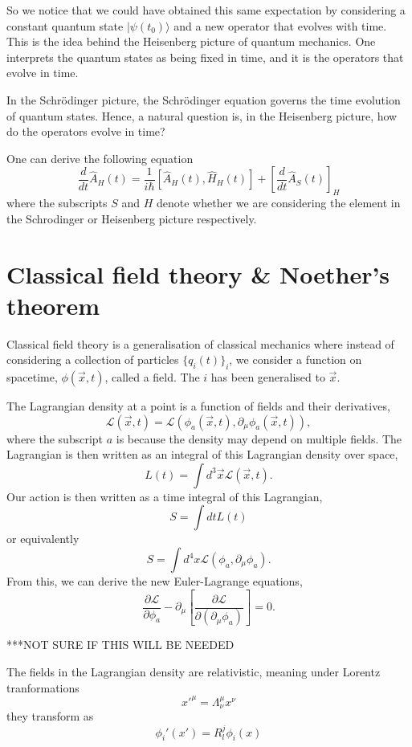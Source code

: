 \documentclass{article}
\theoremstyle{definition}
\theoremstyle{plain}
\begin{document}
So we notice that we could have obtained this same 
expectation by considering a constant quantum state 
$| \psi(t_0) \rangle$ and a new operator that evolves with 
time. This is the idea behind the Heisenberg picture of 
quantum mechanics. One interprets the quantum states as 
being fixed in time, and it is the operators that evolve 
in time. 

In the Schrödinger picture, the Schrödinger equation 
governs the time evolution of quantum states. Hence, a 
natural question is, in the Heisenberg picture, how do the 
operators evolve in time?

One can derive the following equation
\[ \frac{d}{dt} \hat{A}_H(t) = \frac{1}{i \hbar} [\hat{A}_H(t), \hat{H}_H(t)] + \left[\frac{d}{dt} \hat{A}_S(t) \right]_H \]
where the subscripts $S$ and $H$ denote whether we are considering the element in the Schrodinger or Heisenberg picture respectively. 

\section{Classical field theory \& Noether's theorem}
Classical field theory is a generalisation of classical 
mechanics where instead of considering a collection of 
particles $\{q_i(t)\}_i$, we consider a function on 
spacetime, $\phi(\vec{x},t)$, called a field. The $i$ has 
been generalised to $\vec{x}$.

The Lagrangian density at a point is a function of 
fields and their derivatives, 
\[\mathcal{L} (\vec{x},t) = \mathcal{L}( \phi_a (\vec{x},t),\partial_{\mu} \phi_a (\vec{x},t) ),\]
where the subscript $a$ is because the density may depend on multiple fields.
The Lagrangian is then written as an integral of this Lagrangian density over space,
\[ L(t) = \int d^3\vec{x} \mathcal{L} (\vec{x},t) .\]
Our action is then written as a time integral of this Lagrangian,
\[ S = \int dt L(t) \]
or equivalently
\[ S = \int d^4x \mathcal{L} ( \phi_a,\partial_{\mu} \phi_a ). \]
From this, we can derive the new Euler-Lagrange equations,
\[ \frac{\partial \mathcal{L}}{\partial \phi_a} - \partial_{\mu} \left[ \frac{\partial \mathcal{L}}{ \partial (\partial_{\mu} \phi_a)} \right] =0 .\]

***NOT SURE IF THIS WILL BE NEEDED

The fields in the Lagrangian density are relativistic, 
meaning under Lorentz tranformations
\[ x'^{\mu} = \Lambda^{\mu}_{\nu} x^{\nu} \]
they transform as 
\[ \phi_i'(x') = R_l^j \phi_i(x) \]
\end{document}
